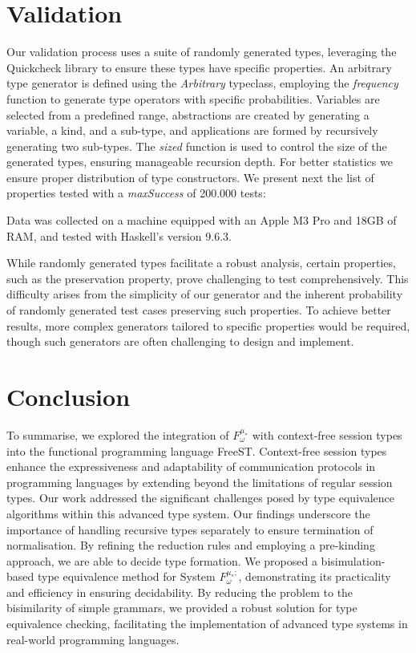\documentclass[runningheads,dvipsnames]{llncs}
\begin{document}
\section{Validation}
Our validation process uses a suite of randomly generated types, leveraging the Quickcheck library\cite{DBLP:conf/icfp/ClaessenH00} to ensure these types have specific properties. An arbitrary type generator is defined using the \textit{Arbitrary} typeclass, employing the \textit{frequency} function to generate type operators with specific probabilities. Variables are selected from a predefined range, abstractions are created by generating a variable, a kind, and a sub-type, and applications are formed by recursively generating two sub-types. The \textit{sized} function is used to control the size of the generated types, ensuring manageable recursion depth. For better statistics we ensure proper distribution of type constructors. We present next the list of properties tested with a \textit{maxSuccess} of 200.000 tests:



Data was collected on a machine equipped with an Apple M3 Pro and 18GB of RAM, and tested with Haskell's version 9.6.3.

While randomly generated types facilitate a robust analysis, certain properties, such as the preservation property, prove challenging to test comprehensively. This difficulty arises from the simplicity of our generator and the inherent probability of randomly generated test cases preserving such properties. To achieve better results, more complex generators tailored to specific properties would be required, though such generators are often challenging to design and implement. 

\section{Conclusion}
To summarise, we explored the integration of $F^{\mu_*}_\omega$ with context-free session types into the functional programming language FreeST. Context-free session types enhance the expressiveness and adaptability of communication protocols in programming languages by extending beyond the limitations of regular session types. Our work addressed the significant challenges posed by type equivalence algorithms within this advanced type system. Our findings underscore the importance of handling recursive types separately to ensure termination of normalisation. By refining the reduction rules and employing a pre-kinding approach, we are able to decide type formation.
We proposed a bisimulation-based type equivalence method for System $F^{\mu_*;}_\omega$, demonstrating its practicality and efficiency in ensuring decidability. By reducing the problem to the bisimilarity of simple grammars, we provided a robust solution for type equivalence checking, facilitating the implementation of advanced type systems in real-world programming languages.
\end{document}
